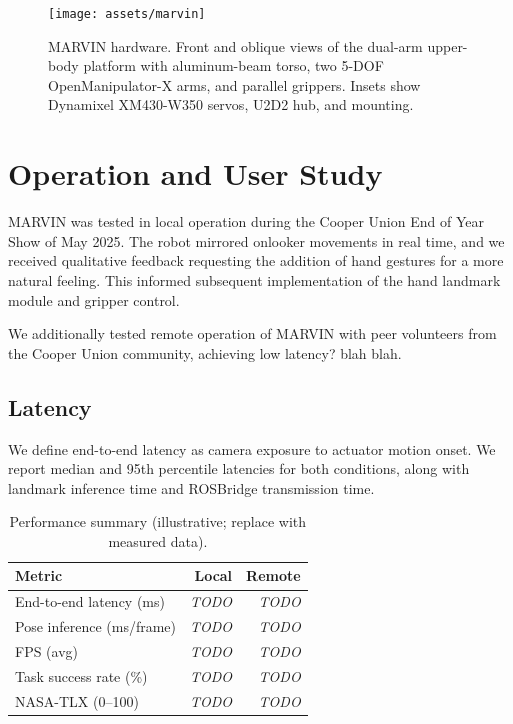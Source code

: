 \documentclass[manuscript,screen]{acmart} %
\begin{document}
\begin{figure}[htbp]
  \centering
  \texttt{[image: assets/marvin]}
  \caption{MARVIN hardware. Front and oblique views of the dual-arm upper-body platform with aluminum-beam torso, two 5-DOF OpenManipulator-X arms, and parallel grippers. Insets show Dynamixel XM430-W350 servos, U2D2 hub, and mounting.}
  \label{fig:photos}
\end{figure}

\section{Operation and User Study}
MARVIN was tested in local operation during the Cooper Union End of 
Year Show of May 2025. The robot mirrored onlooker movements in real time, 
and we received qualitative feedback requesting the addition of hand 
gestures for a more natural feeling. This informed subsequent implementation 
of the hand landmark module and gripper control. 

We additionally tested remote operation of MARVIN with peer volunteers from the Cooper Union
community, achieving low latency? blah blah. %

\subsection{Latency}\label{sec:latency}
We define end-to-end latency as camera exposure to actuator motion onset. 
We report median and 95th percentile latencies for both conditions, 
along with landmark inference time and ROSBridge transmission time.

\begin{table}[htbp]
  \caption{Performance summary (illustrative; replace with measured data).}
  \label{tab:perf}
  \begin{tabular}{lrr}
    \toprule
    Metric & Local & Remote \\
    \midrule
    End-to-end latency (ms) &  \textit{TODO} & \textit{TODO} \\
    Pose inference (ms/frame) & \textit{TODO} & \textit{TODO} \\
    FPS (avg) & \textit{TODO} & \textit{TODO} \\
    Task success rate (\%) & \textit{TODO} & \textit{TODO} \\
    NASA-TLX (0--100) & \textit{TODO} & \textit{TODO} \\
    \bottomrule
  \end{tabular}
\end{table}
\end{document}
